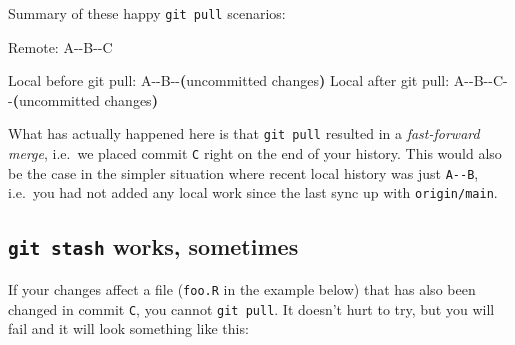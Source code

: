 \documentclass[
]{book}
\newenvironment{Shaded}{\begin{snugshade}}{\end{snugshade}}
\newcommand{\ErrorTok}[1]{\textcolor[rgb]{0.64,0.00,0.00}{\textbf{#1}}}
\newcommand{\ExtensionTok}[1]{#1}
\newcommand{\KeywordTok}[1]{\textcolor[rgb]{0.13,0.29,0.53}{\textbf{#1}}}
\newcommand{\NormalTok}[1]{#1}
\newcommand{\StringTok}[1]{\textcolor[rgb]{0.31,0.60,0.02}{#1}}
\begin{document}
Summary of these happy \texttt{git\ pull} scenarios:

\begin{Shaded}
\begin{Highlighting}[]
                 \ExtensionTok{Remote:}\NormalTok{ A{-}{-}B{-}{-}C}

\ExtensionTok{Local}\NormalTok{ before }\StringTok{\textquotesingle{}git pull\textquotesingle{}}\NormalTok{: A{-}{-}B{-}{-}}\ErrorTok{(}\ExtensionTok{uncommitted}\NormalTok{ changes}\KeywordTok{)}
 \ExtensionTok{Local}\NormalTok{ after }\StringTok{\textquotesingle{}git pull\textquotesingle{}}\NormalTok{: A{-}{-}B{-}{-}C{-}{-}}\ErrorTok{(}\ExtensionTok{uncommitted}\NormalTok{ changes}\KeywordTok{)}
\end{Highlighting}
\end{Shaded}

What has actually happened here is that \texttt{git\ pull} resulted in a \emph{fast-forward merge}, i.e.~we placed commit \texttt{C} right on the end of your history. This would also be the case in the simpler situation where recent local history was just \texttt{A-\/-B}, i.e.~you had not added any local work since the last sync up with \texttt{origin/main}.

\subsection{\texorpdfstring{\texttt{git\ stash} works, sometimes}{git stash works, sometimes}}\label{git-stash-works-sometimes}

If your changes affect a file (\texttt{foo.R} in the example below) that has also been changed in commit \texttt{C}, you cannot \texttt{git\ pull}. It doesn't hurt to try, but you will fail and it will look something like this:
\end{document}
